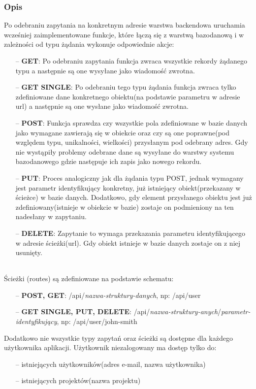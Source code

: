 \documentclass[eng,printmode]{mgr}
\begin{document}
\subsubsection{Opis}
Po odebraniu zapytania na konkretnym adresie warstwa backendowa uruchamia wcześniej zaimplementowane funkcje, które łączą się z warstwą bazodanową i w zależności od typu żądania wykonuje odpowiednie akcje:
\begin{itemize}
  \item[--] \textbf{GET}: Po odebraniu zapytania funkcja zwraca wszystkie rekordy żądanego typu a następnie są one wysyłane jako wiadomość zwrotna.
  \item[--] \textbf{GET SINGLE}: Po odebraniu tego typu żądania funkcja zwraca tylko zdefiniowane dane konkretnego obiektu(na podstawie parametru w adresie url) a następnie są one wysłane jako wiadomość zwrotna.
  \item[--] \textbf{POST}: Funkcja sprawdza czy wszystkie pola zdefiniowane w bazie danych jako wymagane zawierają się w obiekcie oraz czy są one poprawne(pod względem typu, unikalności, wielkości) przysłanym pod odebrany adres. Gdy nie wystąpiły problemy odebrane dane są wysyłane do warstwy systemu bazodanowego gdzie następuje ich zapis jako nowego rekordu.
  \item[--] \textbf{PUT}: Proces analogiczny jak dla żądania typu POST, jednak wymagany jest parametr identyfikujący konkretny, już istniejący obiekt(przekazany w ścieżce) w bazie danych. Dodatkowo, gdy element przysłanego obiektu jest już zdefiniowany(istnieje w obiekcie w bazie) zostaje on podmieniony na ten nadesłany w zapytaniu.
  \item[--] \textbf{DELETE}: Zapytanie to wymaga przekazania parametru identyfikującego w adresie ścieżki(url). Gdy obiekt istnieje w bazie danych zostaje on z niej usunięty.
\end{itemize}
\ \\
Ścieżki (routes) są zdefiniowane na podstawie schematu:
\begin{itemize}
  \item[--] \textbf{POST, GET}: /api/\textit{nazwa-struktury-danych}, np: /api/user
  \item[--] \textbf{GET SINGLE, PUT, DELETE}: /api/\textit{nazwa-struktury-anych}/\textit{parametr-identyfikujący}, np: /api/user/john-smith
\end{itemize}
Dodatkowo nie wszystkie typy zapytań oraz ścieżki są dostępne dla każdego użytkownika aplikacji. Użytkownik niezalogowany ma dostęp tylko do:
\begin{itemize}
  \item [--] istniejących użytkowników(adres e-mail, nazwa użytkownika)
  \item[--] istniejących projektów(nazwa projektu)
\end{itemize}
\end{document}

